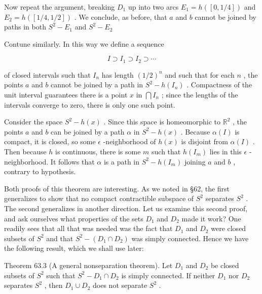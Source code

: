 Now repeat the argument, breaking \({D}_{1}\) up into two arcs \({E}_{1} = h\left( \left\lbrack  {0,1/4}\right\rbrack  \right)\) and \({E}_{2} = h\left( \left\lbrack  {1/4,1/2}\right\rbrack  \right)\) . We conclude, as before, that \(a\) and \(b\) cannot be joined by paths in both \({S}^{2} - {E}_{1}\) and \({S}^{2} - {E}_{2}\)

Contune similarly. In this way we define a sequence

\[
I \supset  {I}_{1} \supset  {I}_{2} \supset  \cdots
\]

of closed intervals such that \({I}_{n}\) has length \({\left( 1/2\right) }^{n}\) and such that for each \(n\) , the points \(a\) and \(b\) cannot be joined by a path in \({S}^{2} - h\left( {I}_{n}\right)\) . Compactness of the unit interval guarantees there is a point \(x\) in \(\bigcap {I}_{n}\) ; since the lengths of the intervals converge to zero, there is only one such point.

Consider the space \({S}^{2} - h\left( x\right)\) . Since this space is homeomorphic to \({\mathbb{R}}^{2}\) , the points \(a\) and \(b\) can be joined by a path \(\alpha\) in \({S}^{2} - h\left( x\right)\) . Because \(\alpha \left( I\right)\) is compact, it is closed, so some \(\epsilon\) -neighborhood of \(h\left( x\right)\) is disjoint from \(\alpha \left( I\right)\) . Then because \(h\) is continuous, there is some \(m\) such that \(h\left( {I}_{m}\right)\) lies in this \(\epsilon\) -neighborhood. It follows that \(\alpha\) is a path in \({S}^{2} - h\left( {I}_{m}\right)\) joining \(a\) and \(b\) , contrary to hypothesis.

Both proofs of this theorem are interesting. As we noted in  \S 62, the first generalizes to show that no compact contractible subspace of \({S}^{2}\) separates \({S}^{2}\) . The second generalizes in another direction. Let us examine this second proof, and ask ourselves what properties of the sets \({D}_{1}\) and \({D}_{2}\) made it work? One readily sees that all that was needed was the fact that \({D}_{1}\) and \({D}_{2}\) were closed subsets of \({S}^{2}\) and that \({S}^{2} - \left( {{D}_{1} \cap  {D}_{2}}\right)\) was simply connected. Hence we have the following result, which we shall use later:

Theorem 63.3 (A general nonseparation theorem). Let \({D}_{1}\) and \({D}_{2}\) be closed subsets of \({S}^{2}\) such that \({S}^{2} - {D}_{1} \cap  {D}_{2}\) is simply connected. If neither \({D}_{1}\) nor \({D}_{2}\) separates \({S}^{2}\) , then \({D}_{1} \cup  {D}_{2}\) does not separate \({S}^{2}\) .

